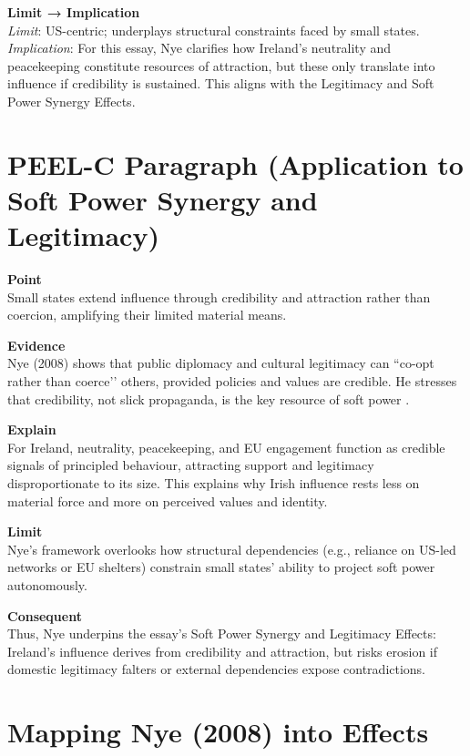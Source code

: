 \textbf{Limit → Implication} \\
\textit{Limit}: US-centric; underplays structural constraints faced by small states. \\
\textit{Implication}: For this essay, Nye clarifies how Ireland’s neutrality and peacekeeping constitute resources of attraction, but these only translate into influence if credibility is sustained. This aligns with the Legitimacy and Soft Power Synergy Effects.

\section*{PEEL-C Paragraph (Application to Soft Power Synergy and Legitimacy)}

\textbf{Point} \\
Small states extend influence through credibility and attraction rather than coercion, amplifying their limited material means.

\textbf{Evidence} \\
Nye (2008) shows that public diplomacy and cultural legitimacy can ``co-opt rather than coerce’’ others, provided policies and values are credible. He stresses that credibility, not slick propaganda, is the key resource of soft power \parencite{NYE_2008}.

\textbf{Explain} \\
For Ireland, neutrality, peacekeeping, and EU engagement function as credible signals of principled behaviour, attracting support and legitimacy disproportionate to its size. This explains why Irish influence rests less on material force and more on perceived values and identity.

\textbf{Limit} \\
Nye’s framework overlooks how structural dependencies (e.g., reliance on US-led networks or EU shelters) constrain small states’ ability to project soft power autonomously.

\textbf{Consequent} \\
Thus, Nye underpins the essay’s Soft Power Synergy and Legitimacy Effects: Ireland’s influence derives from credibility and attraction, but risks erosion if domestic legitimacy falters or external dependencies expose contradictions.

\section*{Mapping Nye (2008) into Effects}

